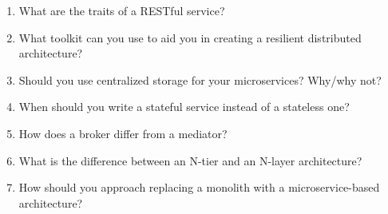 \begin{enumerate}
\item
What are the traits of a RESTful service?

\item
What toolkit can you use to aid you in creating a resilient distributed architecture?

\item
Should you use centralized storage for your microservices? Why/why not?

\item
When should you write a stateful service instead of a stateless one?

\item
How does a broker differ from a mediator?

\item
What is the difference between an N-tier and an N-layer architecture?

\item
How should you approach replacing a monolith with a microservice-based architecture?
\end{enumerate}